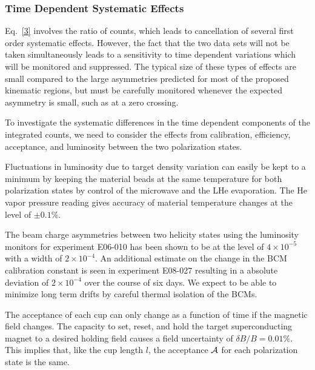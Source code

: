 \subsubsection*{Time Dependent Systematic Effects}
Eq.~\ref{3} involves the ratio of counts, which leads to cancellation of several first order systematic effects.  However, the fact that the two data sets will not be taken simultaneously leads to a sensitivity to time dependent variations which will be monitored and suppressed. The typical size of these types of effects are small compared to the large asymmetries predicted for most of the proposed kinematic regions, but must be carefully monitored whenever the expected asymmetry is small, such as at a zero crossing.

%
To investigate the systematic differences in the time dependent components of the integrated counts, we need to consider the effects from calibration, efficiency, acceptance, and luminosity between the two polarization states.

Fluctuations in luminosity due to target density variation can easily be kept to a minimum by keeping the material beads at the same temperature for both polarization states by control of the microwave and the LHe evaporation.  The He vapor pressure reading gives accuracy of material temperature changes at the level of $\pm0.1\%$.

The beam charge asymmetries between two helicity states using the luminosity monitors for experiment
E06-010 has been shown to be at the level of $4 \times 10^{-5}$ with a width of $2 \times 10^{-4}$.
An additional estimate on the change in the BCM calibration constant is seen in
experiment E08-027 resulting in a absolute deviation of $2 \times 10^{-4}$ over the course of six
days. We expect to be able to minimize long term drifts by careful thermal isolation of
the BCMs.

The acceptance of each cup can only change as a function of time if the magnetic field changes.  
The capacity to set, reset, and hold the target superconducting magnet to a desired holding field causes a field uncertainty of $\delta B /B=0.01\%$. 
This implies that, like the cup length $l$, the acceptance ${\cal A}$ for each polarization state is the same.

